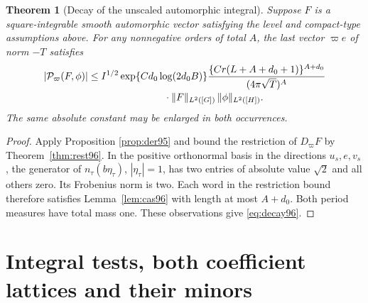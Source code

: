 \documentclass[a4paper,11pt]{article}
\newtheorem{theorem}[proposition]{Theorem}
\theoremstyle{definition}
\theoremstyle{remark}
\numberwithin{equation}{section}
\begin{document}
\begin{theorem}[Decay of the unscaled automorphic integral]\label{thm:decay96}
Suppose \(F\) is a square-integrable smooth automorphic vector
satisfying the level and compact-type assumptions above. For
any nonnegative orders of total \(A\), the last vector
\(\varpi e\) of norm \(-T\) satisfies
\begin{equation}
 \begin{split}
 |{\cal P}_{\varpi}(F,\phi)|
 &\le I^{1/2}\exp\{Cd_0\log(2d_0B)\}
   \frac{\{Cr(L+A+d_0+1)\}^{A+d_0}}{(4\pi\sqrt T)^A}\\[-2pt]
 &\hspace{27mm}{}\cdot\|F\|_{L^2([G])}\,\|\phi\|_{L^2([H])}.
 \end{split}                                                    \label{eq:decay96}
\end{equation}
The same absolute constant may be enlarged in both occurrences.
\end{theorem}
\begin{proof}
Apply Proposition \ref{prop:der95}
and bound the restriction of \(D_{\varpi}F\) by
Theorem~\ref{thm:rest96}. In the positive orthonormal basis
in the directions \(u_s,e,v_s\), the generator of
\(n_\tau(b\eta_\tau)\), \(|\eta_\tau|=1\), has two entries of
absolute value \(\sqrt2\) and all others zero. Its Frobenius
norm is two. Each word in the restriction bound therefore
satisfies Lemma~\ref{lem:cas96} with length at most \(A+d_0\).
Both period measures have total mass one. These observations give
\eqref{eq:decay96}.
\end{proof}

\section{Integral tests, both coefficient lattices and their minors}\label{nav:g-XII-1}
\end{document}
